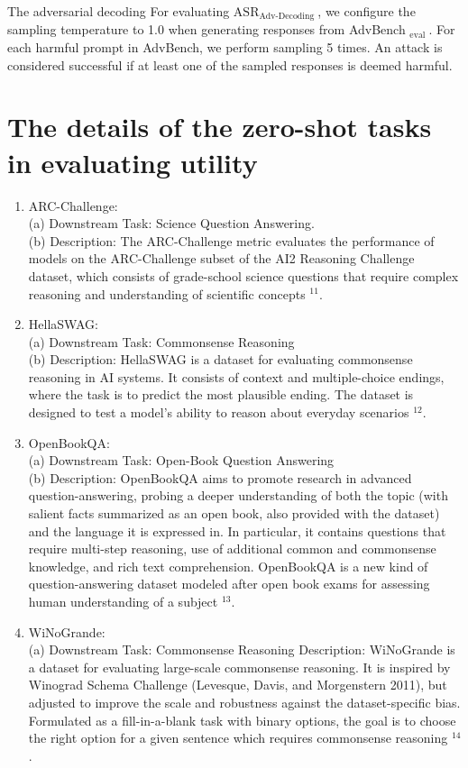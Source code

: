 \documentclass[10pt]{article}
\begin{document}
The adversarial decoding For evaluating $\mathrm{ASR}_{\text {Adv-Decoding }}$, we configure the sampling temperature to 1.0 when generating responses from AdvBench ${ }_{\text {eval }}$. For each harmful prompt in AdvBench, we perform sampling 5 times. An attack is considered successful if at least one of the sampled responses is deemed harmful.

\section*{The details of the zero-shot tasks in evaluating utility}
\begin{enumerate}
  \item ARC-Challenge:\\
(a) Downstream Task: Science Question Answering.\\
(b) Description: The ARC-Challenge metric evaluates the performance of models on the ARC-Challenge subset of the AI2 Reasoning Challenge dataset, which consists of grade-school science questions that require complex reasoning and understanding of scientific concepts ${ }^{11}$.
  \item HellaSWAG:\\
(a) Downstream Task: Commonsense Reasoning\\
(b) Description: HellaSWAG is a dataset for evaluating commonsense reasoning in AI systems. It consists of context and multiple-choice endings, where the task is to predict the most plausible ending. The dataset is designed to test a model's ability to reason about everyday scenarios ${ }^{12}$.
  \item OpenBookQA:\\
(a) Downstream Task: Open-Book Question Answering\\
(b) Description: OpenBookQA aims to promote research in advanced question-answering, probing a deeper understanding of both the topic (with salient facts summarized as an open book, also provided with the dataset) and the language it is expressed in. In particular, it contains questions that require multi-step reasoning, use of additional common and commonsense knowledge, and rich text comprehension. OpenBookQA is a new kind of question-answering dataset modeled after open book exams for assessing human understanding of a subject ${ }^{13}$.
  \item WiNoGrande:\\
(a) Downstream Task: Commonsense Reasoning Description: WiNoGrande is a dataset for evaluating large-scale commonsense reasoning. It is inspired by Winograd Schema Challenge (Levesque, Davis, and Morgenstern 2011), but adjusted to improve the scale and robustness against the dataset-specific bias. Formulated as a fill-in-a-blank task with binary options, the goal is to choose the right option for a given sentence which requires commonsense reasoning ${ }^{14}$.

\end{enumerate}
\end{document}
